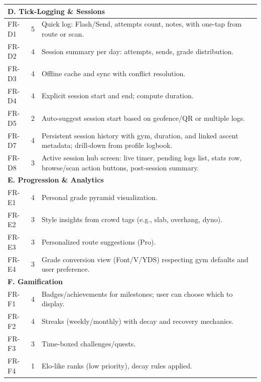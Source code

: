 \documentclass[12pt,a4paper]{report}
\renewcommand\_{\textunderscore\hspace{0pt}}
\begin{document}
\begin{longtable}{l c >{\raggedright\arraybackslash}p{11cm}}
\hline
\multicolumn{3}{l}{\textbf{D. Tick-Logging \& Sessions}} \\
\hline
FR-D1 & 5 & Quick log: Flash/Send, attempts count, notes, with one-tap from route or scan. \\
FR-D2 & 4 & Session summary per day: attempts, sends, grade distribution. \\
FR-D3 & 4 & Offline cache and sync with conflict resolution. \\
FR-D4 & 4 & Explicit session start and end; compute duration. \\
FR-D5 & 2 & Auto-suggest session start based on geofence/QR or multiple logs. \\
FR-D7 & 4 & Persistent session history with gym, duration, and linked ascent metadata; drill-down from profile logbook. \\
FR-D8 & 3 & Active session hub screen: live timer, pending logs list, stats row, browse/scan action buttons, post-session summary. \\

\hline
\multicolumn{3}{l}{\textbf{E. Progression \& Analytics}} \\
\hline
FR-E1 & 4 & Personal grade pyramid visualization. \\
FR-E2 & 3 & Style insights from crowd tags (e.g., slab, overhang, dyno). \\
FR-E3 & 3 & Personalized route suggestions (Pro). \\
FR-E4 & 3 & Grade conversion view (Font/V/YDS) respecting gym defaults and user preference. \\

\hline
\multicolumn{3}{l}{\textbf{F. Gamification}} \\
\hline
FR-F1 & 4 & Badges/achievements for milestones; user can choose which to display. \\
FR-F2 & 4 & Streaks (weekly/monthly) with decay and recovery mechanics. \\
FR-F3 & 3 & Time-boxed challenges/quests. \\
FR-F4 & 1 & Elo-like ranks (low priority), decay rules applied. \\


\end{longtable}
\end{document}
